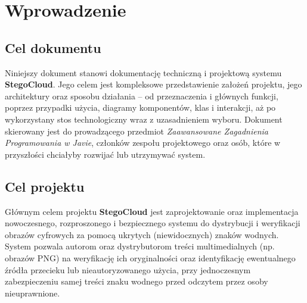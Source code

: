 \documentclass[12pt,a4paper]{article}
\begin{document}
\newpage

{
  \hypersetup{linkcolor=black}
  \tableofcontents
}
\newpage

\section{Wprowadzenie}

\subsection{Cel dokumentu}
Niniejszy dokument stanowi dokumentację techniczną i projektową systemu \textbf{StegoCloud}. Jego celem jest kompleksowe przedstawienie założeń projektu, jego architektury oraz sposobu działania -- od przeznaczenia i głównych funkcji, poprzez przypadki użycia, diagramy komponentów, klas i interakcji, aż po wykorzystany stos technologiczny wraz z uzasadnieniem wyboru. Dokument skierowany jest do prowadzącego przedmiot \textit{Zaawansowane Zagadnienia Programowania w Javie}, członków zespołu projektowego oraz osób, które w przyszłości chciałyby rozwijać lub utrzymywać system.

\subsection{Cel projektu}
Głównym celem projektu \textbf{StegoCloud} jest zaprojektowanie oraz implementacja nowoczesnego, rozproszonego i bezpiecznego systemu do dystrybucji i weryfikacji obrazów cyfrowych za pomocą ukrytych (niewidocznych) znaków wodnych. System pozwala autorom oraz dystrybutorom treści multimedialnych (np. obrazów PNG) na weryfikację ich oryginalności oraz identyfikację ewentualnego źródła przecieku lub nieautoryzowanego użycia, przy jednoczesnym zabezpieczeniu samej treści znaku wodnego przed odczytem przez osoby nieuprawnione.
\end{document}
